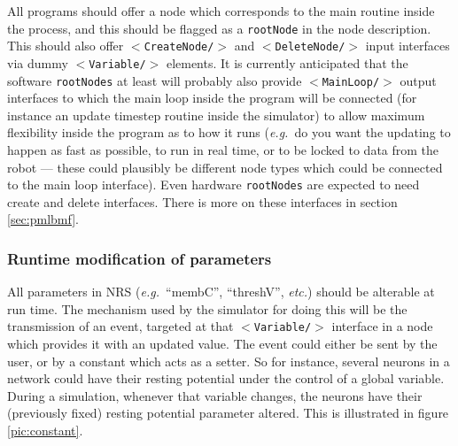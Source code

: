 \documentclass[pdftex,a4paper]{article}
\newif\ifpdf
\newcommand{\eg}{{\em e.g.\ }}
\newcommand{\etc}{{\it etc.}}
\newcommand{\XML}[2][]{{\tt \small $<$#2#1/$>$}}
\newcommand{\XMLfont}[1]{{\tt \small #1}}
\begin{document}
All programs should offer a node which corresponds to the main routine
inside the process, and this should be flagged as a \XMLfont{rootNode}
in the node description. This should also offer \XML{CreateNode} and
\XML{DeleteNode} input interfaces via dummy \XML{Variable}
elements. It is currently anticipated that the software
\XMLfont{rootNodes} at least will probably also provide \XML{MainLoop}
output interfaces to which the main loop inside the program will be
connected (for instance an update timestep routine inside the
simulator) to allow maximum flexibility inside the program as to how
it runs (\eg do you want the updating to happen as fast as possible,
to run in real time, or to be locked to data from the robot --- these
could plausibly be different node types which could be connected to
the main loop interface). Even hardware \XMLfont{rootNodes} are
expected to need create and delete interfaces. There is more on these
interfaces in section \ref{sec:pmlbmf}.

\subsubsection{Runtime modification of parameters}

All parameters in NRS (\eg ``membC'', ``threshV'', \etc) should be
alterable at run time.  The mechanism used by the simulator for doing
this will be the transmission of an event, targeted at that
\XML{Variable} interface in a node which provides it with an updated
value.  The event could either be sent by the user, or by a constant
which acts as a setter. So for instance, several neurons in a network
could have their resting potential under the control of a global
variable. During a simulation, whenever that variable changes, the
neurons have their (previously fixed) resting potential parameter
altered. This is illustrated in figure \ref{pic:constant}.

\ifpdf
\begin{figure}[htb]
  \begin{center}
    \texttt{[image: global\_var.pdf]}
    \caption{Illustration of \emph{floating variables.} The
      ``threshV'' quantities associated with a pair of neurons are
      attached to a constant called ``threshV''. Values of the former
      quantities will always be equal to the value of the latter,
      which has the effect of a global constant. Using such
      arrangements a common set of quantities across multiple
      simulation nodes can quickly be assigned or altered.}
    \label{pic:constant}
  \end{center}
\end{figure}
\fi
\end{document}
